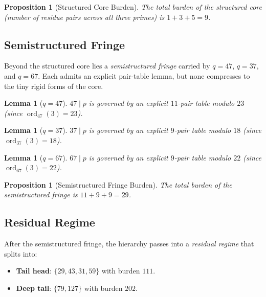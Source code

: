 \documentclass[11pt,letterpaper]{article}
\newtheorem{lemma}[theorem]{Lemma}
\newtheorem{proposition}[theorem]{Proposition}
\begin{document}
\begin{proposition}[Structured Core Burden]\label{prop:coreburden}
The total burden of the structured core (number of residue pairs across all three primes) is $1 + 3 + 5 = 9$.
\end{proposition}

\subsection{Semistructured Fringe}\label{sec:fringe}

Beyond the structured core lies a \emph{semistructured fringe} carried by $q = 47$, $q = 37$, and $q = 67$.
Each admits an explicit pair-table lemma, but none compresses to the tiny rigid forms of the core.

\begin{lemma}[$q = 47$]\label{lem:q47}
$47 \mid p$ is governed by an explicit $11$-pair table modulo $23$ (since $\operatorname{ord}_{47}(3) = 23$).
\end{lemma}

\begin{lemma}[$q = 37$]\label{lem:q37}
$37 \mid p$ is governed by an explicit $9$-pair table modulo $18$ (since $\operatorname{ord}_{37}(3) = 18$).
\end{lemma}

\begin{lemma}[$q = 67$]\label{lem:q67}
$67 \mid p$ is governed by an explicit $9$-pair table modulo $22$ (since $\operatorname{ord}_{67}(3) = 22$).
\end{lemma}

\begin{proposition}[Semistructured Fringe Burden]\label{prop:fringeburden}
The total burden of the semistructured fringe is $11 + 9 + 9 = 29$.
\end{proposition}

\subsection{Residual Regime}\label{sec:residual}

After the semistructured fringe, the hierarchy passes into a \emph{residual regime} that splits into:
\begin{itemize}
    \item \textbf{Tail head}: $\{29, 43, 31, 59\}$ with burden $111$.
    \item \textbf{Deep tail}: $\{79, 127\}$ with burden $202$.
\end{itemize}
\end{document}
